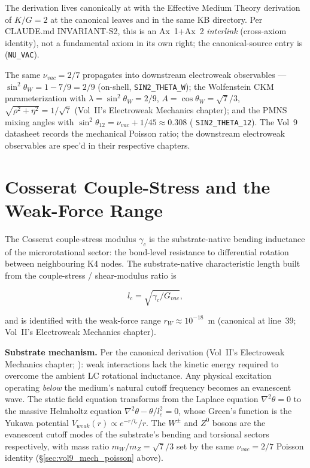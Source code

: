 

The derivation lives canonically at  with the Effective Medium Theory derivation of $K/G = 2$ at the canonical leaves  and  in the same KB directory. Per CLAUDE.md INVARIANT-S2, this is an Ax~1+Ax~2 \emph{interlink} (cross-axiom identity), not a fundamental axiom in its own right; the canonical-source entry is  (\texttt{NU\_VAC}).

The same $\nu_{vac} = 2/7$ propagates into downstream electroweak observables --- $\sin^2\theta_W = 1 - 7/9 = 2/9$ (on-shell,  \texttt{SIN2\_THETA\_W}); the Wolfenstein CKM parameterization with $\lambda = \sin^2\theta_W = 2/9$, $A = \cos\theta_W = \sqrt{7}/3$, $\sqrt{\rho^2 + \eta^2} = 1/\sqrt{7}$ (Vol~II's Electroweak Mechanics chapter); and the PMNS mixing angles with $\sin^2\theta_{12} = \nu_{vac} + 1/45 \approx 0.308$ ( \texttt{SIN2\_THETA\_12}). The Vol~9 datasheet records the mechanical Poisson ratio; the downstream electroweak observables are spec'd in their respective chapters.

\section{Cosserat Couple-Stress and the Weak-Force Range}
\label{sec:vol9_mech_couple_stress}

The Cosserat couple-stress modulus $\gamma_c$ is the substrate-native bending inductance of the microrotational sector: the bond-level resistance to differential rotation between neighbouring K4 nodes. The substrate-native characteristic length built from the couple-stress / shear-modulus ratio is

\[
l_c = \sqrt{\gamma_c / G_{vac}},
\]

and is identified with the weak-force range $r_W \approx 10^{-18}$~m (canonical at  line~39; Vol~II's Electroweak Mechanics chapter).

\textbf{Substrate mechanism.} Per the canonical derivation (Vol~II's Electroweak Mechanics chapter; ): weak interactions lack the kinetic energy required to overcome the ambient LC rotational inductance. Any physical excitation operating \emph{below} the medium's natural cutoff frequency becomes an evanescent wave. The static field equation transforms from the Laplace equation $\nabla^2 \theta = 0$ to the massive Helmholtz equation $\nabla^2 \theta - \theta / l_c^2 = 0$, whose Green's function is the Yukawa potential $V_{weak}(r) \propto e^{-r/l_c}/r$. The $W^\pm$ and $Z^0$ bosons are the evanescent cutoff modes of the substrate's bending and torsional sectors respectively, with mass ratio $m_W/m_Z = \sqrt{7}/3$ set by the same $\nu_{vac} = 2/7$ Poisson identity (\S\ref{sec:vol9_mech_poisson} above).

